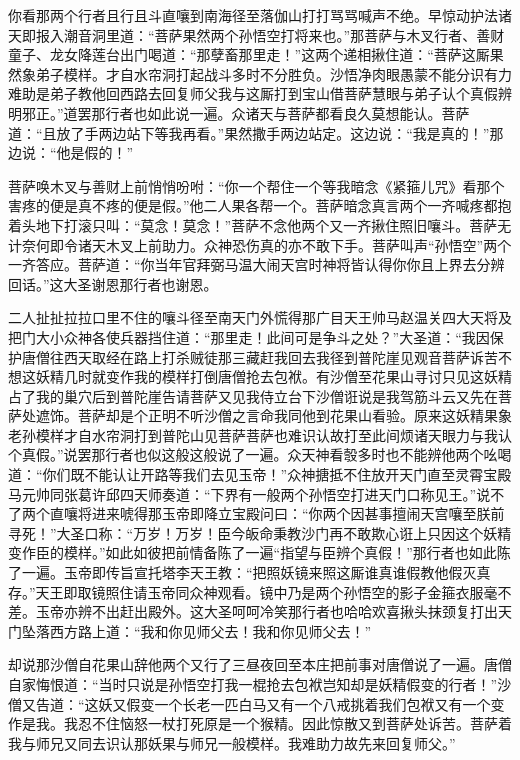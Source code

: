 \documentclass[12pt,UTF8]{ctexbook}
\begin{document}
你看那两个行者且行且斗直嚷到南海径至落伽山打打骂骂喊声不绝。早惊动护法诸天即报入潮音洞里道：“菩萨果然两个孙悟空打将来也。”那菩萨与木叉行者、善财童子、龙女降莲台出门喝道：“那孽畜那里走！”这两个递相揪住道：“菩萨这厮果然象弟子模样。才自水帘洞打起战斗多时不分胜负。沙悟净肉眼愚蒙不能分识有力难助是弟子教他回西路去回复师父我与这厮打到宝山借菩萨慧眼与弟子认个真假辨明邪正。”道罢那行者也如此说一遍。众诸天与菩萨都看良久莫想能认。菩萨道：“且放了手两边站下等我再看。”果然撒手两边站定。这边说：“我是真的！”那边说：“他是假的！”

菩萨唤木叉与善财上前悄悄吩咐：“你一个帮住一个等我暗念《紧箍儿咒》看那个害疼的便是真不疼的便是假。”他二人果各帮一个。菩萨暗念真言两个一齐喊疼都抱着头地下打滚只叫：“莫念！莫念！”菩萨不念他两个又一齐揪住照旧嚷斗。菩萨无计奈何即令诸天木叉上前助力。众神恐伤真的亦不敢下手。菩萨叫声“孙悟空”两个一齐答应。菩萨道：“你当年官拜弼马温大闹天宫时神将皆认得你你且上界去分辨回话。”这大圣谢恩那行者也谢恩。

二人扯扯拉拉口里不住的嚷斗径至南天门外慌得那广目天王帅马赵温关四大天将及把门大小众神各使兵器挡住道：“那里走！此间可是争斗之处？”大圣道：“我因保护唐僧往西天取经在路上打杀贼徒那三藏赶我回去我径到普陀崖见观音菩萨诉苦不想这妖精几时就变作我的模样打倒唐僧抢去包袱。有沙僧至花果山寻讨只见这妖精占了我的巢穴后到普陀崖告请菩萨又见我侍立台下沙僧诳说是我驾筋斗云又先在菩萨处遮饰。菩萨却是个正明不听沙僧之言命我同他到花果山看验。原来这妖精果象老孙模样才自水帘洞打到普陀山见菩萨菩萨也难识认故打至此间烦诸天眼力与我认个真假。”说罢那行者也似这般这般说了一遍。众天神看彀多时也不能辨他两个吆喝道：“你们既不能认让开路等我们去见玉帝！”众神搪抵不住放开天门直至灵霄宝殿马元帅同张葛许邱四天师奏道：“下界有一般两个孙悟空打进天门口称见王。”说不了两个直嚷将进来唬得那玉帝即降立宝殿问曰：“你两个因甚事擅闹天宫嚷至朕前寻死！”大圣口称：“万岁！万岁！臣今皈命秉教沙门再不敢欺心诳上只因这个妖精变作臣的模样。”如此如彼把前情备陈了一遍“指望与臣辨个真假！”那行者也如此陈了一遍。玉帝即传旨宣托塔李天王教：“把照妖镜来照这厮谁真谁假教他假灭真存。”天王即取镜照住请玉帝同众神观看。镜中乃是两个孙悟空的影子金箍衣服毫不差。玉帝亦辨不出赶出殿外。这大圣呵呵冷笑那行者也哈哈欢喜揪头抹颈复打出天门坠落西方路上道：“我和你见师父去！我和你见师父去！”

却说那沙僧自花果山辞他两个又行了三昼夜回至本庄把前事对唐僧说了一遍。唐僧自家悔恨道：“当时只说是孙悟空打我一棍抢去包袱岂知却是妖精假变的行者！”沙僧又告道：“这妖又假变一个长老一匹白马又有一个八戒挑着我们包袱又有一个变作是我。我忍不住恼怒一杖打死原是一个猴精。因此惊散又到菩萨处诉苦。菩萨着我与师兄又同去识认那妖果与师兄一般模样。我难助力故先来回复师父。”
\end{document}
